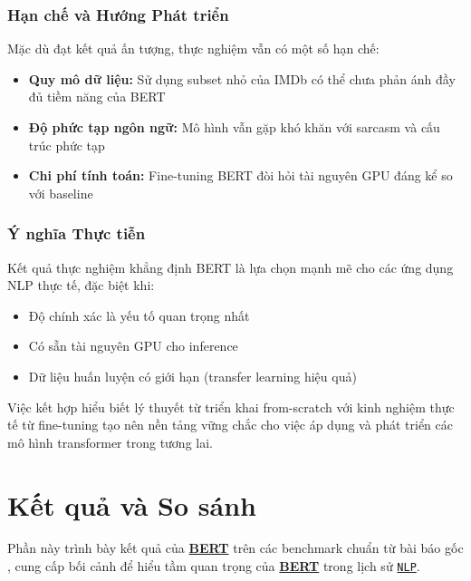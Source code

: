 \subsubsection{Hạn chế và Hướng Phát triển}

Mặc dù đạt kết quả ấn tượng, thực nghiệm vẫn có một số hạn chế:

\begin{itemize}
    \item \textbf{Quy mô dữ liệu:} Sử dụng subset nhỏ của IMDb có thể chưa phản ánh đầy đủ tiềm năng của BERT
    \item \textbf{Độ phức tạp ngôn ngữ:} Mô hình vẫn gặp khó khăn với sarcasm và cấu trúc phức tạp
    \item \textbf{Chi phí tính toán:} Fine-tuning BERT đòi hỏi tài nguyên GPU đáng kể so với baseline
\end{itemize}

\subsubsection{Ý nghĩa Thực tiễn}

Kết quả thực nghiệm khẳng định BERT là lựa chọn mạnh mẽ cho các ứng dụng NLP thực tế, đặc biệt khi:
\begin{itemize}
    \item Độ chính xác là yếu tố quan trọng nhất
    \item Có sẵn tài nguyên GPU cho inference
    \item Dữ liệu huấn luyện có giới hạn (transfer learning hiệu quả)
\end{itemize}

Việc kết hợp hiểu biết lý thuyết từ triển khai from-scratch với kinh nghiệm thực tế từ fine-tuning tạo nên nền tảng vững chắc cho việc áp dụng và phát triển các mô hình transformer trong tương lai.


\section{Kết quả và So sánh}
\label{sec:ket_qua_so_sanh}

Phần này trình bày kết quả của \hyperref[acro:bert]{\textbf{BERT}} trên các benchmark chuẩn từ bài báo gốc \cite{devlin2018bert}, cung cấp bối cảnh để hiểu tầm quan trọng của \hyperref[acro:bert]{\textbf{BERT}} trong lịch sử \hyperref[acro:nlp]{\texttt{NLP}}.

